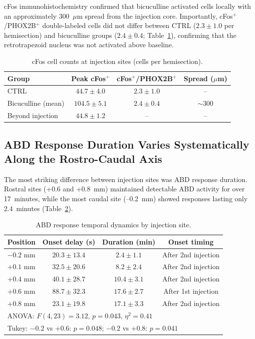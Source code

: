 \documentclass[11pt]{article}
\begin{document}
cFos immunohistochemistry confirmed that bicuculline activated cells locally with an approximately 300~$\mu$m spread from the injection core. Importantly, cFos$^+$/PHOX2B$^+$ double-labeled cells did not differ between CTRL ($2.3 \pm 1.0$ per hemisection) and bicuculline groups ($2.4 \pm 0.4$; Table~\ref{tab:cfos}), confirming that the retrotrapezoid nucleus was not activated above baseline.

\begin{table}[H]
\centering
\caption{cFos cell counts at injection sites (cells per hemisection).}
\label{tab:cfos}
\begin{tabular}{lccc}
\toprule
\textbf{Group} & \textbf{Peak cFos$^+$} & \textbf{cFos$^+$/PHOX2B$^+$} & \textbf{Spread ($\mu$m)} \\
\midrule
CTRL & $44.7 \pm 4.0$ & $2.3 \pm 1.0$ & -- \\
Bicuculline (mean) & $104.5 \pm 5.1$ & $2.4 \pm 0.4$ & ${\sim}300$ \\
Beyond injection & $44.8 \pm 1.2$ & -- & -- \\
\bottomrule
\end{tabular}
\end{table}

\subsection{ABD Response Duration Varies Systematically Along the Rostro-Caudal Axis}

The most striking difference between injection sites was ABD response duration. Rostral sites (+0.6 and +0.8~mm) maintained detectable ABD activity for over 17~minutes, while the most caudal site (--0.2~mm) showed responses lasting only 2.4~minutes (Table~\ref{tab:abd_duration}).

\begin{table}[H]
\centering
\caption{ABD response temporal dynamics by injection site.}
\label{tab:abd_duration}
\begin{tabular}{lccc}
\toprule
\textbf{Position} & \textbf{Onset delay (s)} & \textbf{Duration (min)} & \textbf{Onset timing} \\
\midrule
$-0.2$ mm & $20.3 \pm 13.4$ & $2.4 \pm 1.1$ & After 2nd injection \\
$+0.1$ mm & $32.5 \pm 20.6$ & $8.2 \pm 2.4$ & After 2nd injection \\
$+0.4$ mm & $40.1 \pm 28.7$ & $10.4 \pm 3.1$ & After 2nd injection \\
$+0.6$ mm & $88.7 \pm 32.3$ & $\mathbf{17.6 \pm 2.7}$ & After 1st injection \\
$+0.8$ mm & $23.1 \pm 19.8$ & $17.1 \pm 3.3$ & After 2nd injection \\
\midrule
\multicolumn{4}{l}{ANOVA: $F(4,23) = 3.12$, $p = 0.043$, $\eta^2 = 0.41$} \\
\multicolumn{4}{l}{Tukey: $-0.2$ vs $+0.6$: $p = 0.048$; $-0.2$ vs $+0.8$: $p = 0.041$} \\
\bottomrule
\end{tabular}
\end{table}
\end{document}
